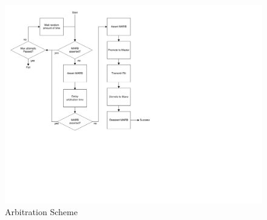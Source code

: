 \begin{figure}[ptb]
	\begin{centering}
		\includegraphics{SPI/Figures/spi-arbitration_scheme.pdf}
		\caption{Arbitration Scheme}
		\label{fig:spi:arbitration_scheme}
	\end{centering}
\end{figure}

